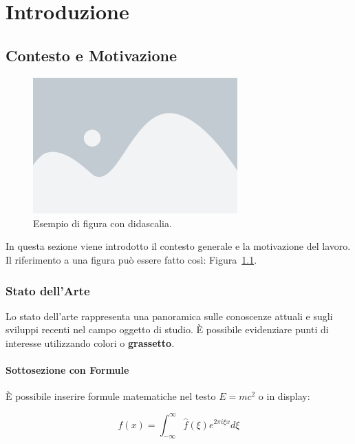 \chapter{Introduzione}

\section{Contesto e Motivazione}

\begin{figure}[htbp]
    \centering
    \includegraphics[width=0.7\textwidth]{immagini/placeholder-figure.png}
    \caption{Esempio di figura con didascalia.}
    \label{fig:esempio-figura}
\end{figure}

In questa sezione viene introdotto il contesto generale e la motivazione del lavoro. Il riferimento a una figura può essere fatto così: Figura~\ref{fig:esempio-figura}.

\subsection{Stato dell'Arte}
Lo stato dell'arte rappresenta una panoramica sulle conoscenze attuali e sugli sviluppi recenti nel campo oggetto di studio. È possibile evidenziare punti di interesse utilizzando \textcolor{unipd-red}{colori} o \textbf{grassetto}.

\subsubsection{Sottosezione con Formule}
È possibile inserire formule matematiche nel testo $E = mc^2$ o in display:

\begin{equation}
    f(x) = \int_{-\infty}^{\infty} \hat{f}(\xi) e^{2\pi i \xi x} d\xi
    \label{eq:esempio-formula}
\end{equation}

